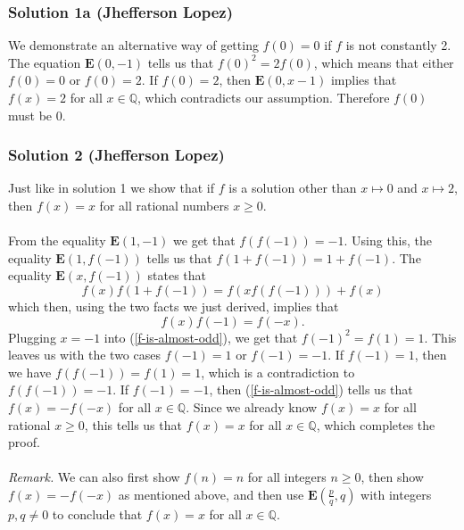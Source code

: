 \subsubsection{Solution 1a (Jhefferson Lopez)}
We demonstrate an alternative way of getting $f(0)=0$ if $f$ is not constantly 2. The equation
$\mathbf{E}(0,-1)$ tells us that $f(0)^2 = 2f(0)$, which means that either $f(0)=0$ or $f(0)=2$. If
$f(0)=2$, then $\mathbf{E}(0,x-1)$ implies that $f(x)=2$ for all $x\in\mathbb{Q}$, which contradicts
our assumption. Therefore $f(0)$ must be 0.

\subsubsection{Solution 2 (Jhefferson Lopez)}
Just like in solution 1 we show that if $f$ is a solution other than $x \mapsto 0$ and 
$x \mapsto 2$, then $f(x) = x$ for all rational numbers $x \geq 0$.\\\\
From the equality $\mathbf{E}(1,-1)$ we get that $f(f(-1))=-1$. Using this, the equality
$\mathbf{E}(1,f(-1))$ tells us that $f(1+f(-1))=1+f(-1)$. The equality $\mathbf{E}(x,f(-1))$ states
that \[f(x)f(1+f(-1)) = f(xf(f(-1)))+f(x)\]
which then, using the two facts we just derived, implies that
\begin{equation}
    f(x)f(-1)=f(-x). \label{f-is-almost-odd}
\end{equation}
Plugging $x=-1$ into (\ref{f-is-almost-odd}), we get that $f(-1)^2=f(1)=1$. This leaves us with the
two cases $f(-1)=1$ or $f(-1)=-1$. If $f(-1)=1$, then we have $f(f(-1))=f(1)=1$, which is a
contradiction to $f(f(-1))=-1$. If $f(-1)=-1$, then (\ref{f-is-almost-odd}) tells us that
$f(x)=-f(-x)$ for all $x\in\mathbb{Q}$. Since we already know $f(x)=x$ for all rational 
$x\geq 0$, this tells us that $f(x)=x$ for all $x\in\mathbb{Q}$, which completes the proof.\\\\
\textit{Remark.} We can also first show $f(n)=n$ for all integers $n\geq
0$, then show $f(x)=-f(-x)$ as mentioned above, and then use $\mathbf{E}(\frac{p}{q},q)$ with
integers $p,q \neq 0$ to conclude that $f(x)=x$ for all $x\in\mathbb{Q}$.

